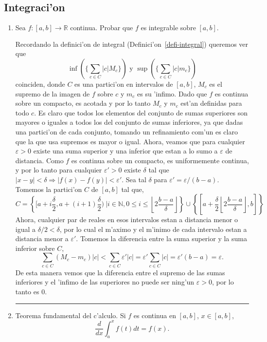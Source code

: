 \documentclass[a4paper,spanish]{article}
\newcommand{\R}[0]{\mathbb{R}}
\newcommand{\N}[0]{\mathbb{N}}
\newcommand{\eps}[0]{\varepsilon}
\newcommand{\lthen}[0]{\Rightarrow}
\newenvironment{demo}{{\noindent \textbf{Demo: }}}{\hfill\rule{2mm}{2mm}\par}
\begin{document}
\subsection{Integraci'on}

\begin{enumerate}

\item Sea $f : [a,b] \to \R$ continua. Probar que $f$ es integrable sobre
$[a,b]$.

\begin{demo}
Recordando la definici'on de integral (Definici'on~\ref{defi-integral})
queremos ver que
$$\inf(\{\sum_{c \in C} |c| M_c\}) \mbox{ y } 
		\sup(\{\sum_{c \in C} |c| m_c\})$$
coinciden, donde $C$ es una partici'on en intervalos de $[a,b]$, $M_c$ es el
supremo de la imagen de $f$ sobre $c$ y $m_c$ es su 'infimo.
Dado que $f$ es continua sobre un compacto, es acotada y por lo tanto $M_c$ y 
$m_c$ est'an definidas para todo $c$. Es claro que todos los elementos del
conjunto de sumas superiores son mayores o iguales a todos los del conjunto de 
sumas inferiores, ya que dadas una partici'on de cada conjunto, tomando un 
refinamiento com'un es claro que la que usa supremos es mayor o igual.
Ahora, veamos que para cualquier $\eps > 0$
existe una suma superior y una inferior que estan a lo sumo a $\eps$ de
distancia. Como $f$ es continua sobre un compacto, es uniformemente continua, 
y por lo tanto para cualquier $\eps' > 0$ existe $\delta$ tal que
$|x-y| < \delta \lthen |f(x)-f(y)| < \eps'$. Sea tal $\delta$ para
$\eps' = \eps/(b-a)$. Tomemos la partici'on $C$ de $[a,b]$ tal que,
$$C = \left\{[a+i\frac{\delta}{2},a+(i+1)\frac{\delta}{2})\ | i \in \N,
		0 \leq i \leq \left\lfloor 2\frac{b-a}{\delta} \right\rfloor \right\} 
	\cup \left\{[a+\frac{\delta}{2}\left\lfloor 2\frac{b-a}{\delta} 
		\right\rfloor,b]\right\}$$
Ahora, cualquier par de reales en esos intervalos estan a distancia menor o
igual a $\delta/2 < \delta$, por lo cual el m'aximo y el m'inimo de cada 
intervalo estan a distancia menor a $\eps'$. Tomemos la diferencia entre la
suma superior y la suma inferior sobre $C$,
$$\sum_{c \in C} (M_c - m_c) |c| < \sum_{c \in C} \eps' |c| = 
	\eps' \sum_{c \in C} |c| = \eps' (b-a) = \eps.$$
De esta manera vemos que la diferencia entre el supremo de las sumas 
inferiores y el 'infimo de las superiores no puede ser ning'un $\eps > 0$, 
por lo tanto es $0$.
\end{demo}

\item Teorema fundamental del c'alculo. Si $f$ es continua en $[a,b]$, 
$x \in [a,b]$,
$$\frac{d}{dx} \int_a^x f(t) dt = f(x).$$


\end{enumerate}
\end{document}
